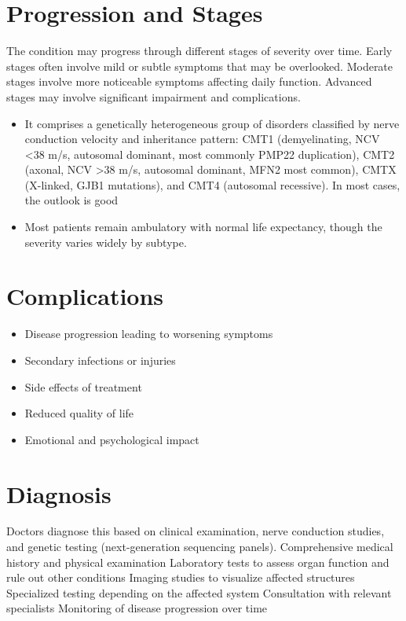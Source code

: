 \section{Progression and Stages}
The condition may progress through different stages of severity over time. Early stages often involve mild or subtle symptoms that may be overlooked. Moderate stages involve more noticeable symptoms affecting daily function. Advanced stages may involve significant impairment and complications.

\begin{itemize}[noitemsep]
  \item It comprises a genetically heterogeneous group of disorders classified by nerve conduction velocity and inheritance pattern: CMT1 (demyelinating, NCV <38 m/s, autosomal dominant, most commonly PMP22 duplication), CMT2 (axonal, NCV >38 m/s, autosomal dominant, MFN2 most common), CMTX (X-linked, GJB1 mutations), and CMT4 (autosomal recessive). In most cases, the outlook is good
  \item Most patients remain ambulatory with normal life expectancy, though the severity varies widely by subtype.
\end{itemize}
\section{Complications}
\begin{itemize}[noitemsep]
  \item Disease progression leading to worsening symptoms
  \item Secondary infections or injuries
  \item Side effects of treatment
  \item Reduced quality of life
  \item Emotional and psychological impact
\end{itemize}
\section{Diagnosis}
Doctors diagnose this based on clinical examination, nerve conduction studies, and genetic testing (next-generation sequencing panels). Comprehensive medical history and physical examination Laboratory tests to assess organ function and rule out other conditions Imaging studies to visualize affected structures Specialized testing depending on the affected system Consultation with relevant specialists Monitoring of disease progression over time

